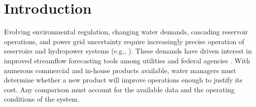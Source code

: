 \documentclass[MLA]{USG} %
\begin{document}



\maketitle




\section{Introduction}


Evolving environmental regulation, changing water demands, cascading reservoir operations, and power grid uncertainty require increasingly precise operation of reservoirs and hydropower systems (e.g., \cite{leeDevelopingResilientReservoir2025,guoReservoirControlOperations2024,badrDamSystemReservoir2023,aljodaUncertaintiesRisksReservoir2021}). These demands have driven interest in improved streamflow forecasting tools among utilities and federal agencies \citep{yangSensitivityForecastValue2021,paganoChallengesOperationalRiver2014,liuAdvancingDataAssimilation2012}. With numerous commercial and in-house products available, water managers must determine whether a new product will improve operations enough to justify its cost. Any comparison must account for the available data and the operating conditions of the system.
\end{document}
